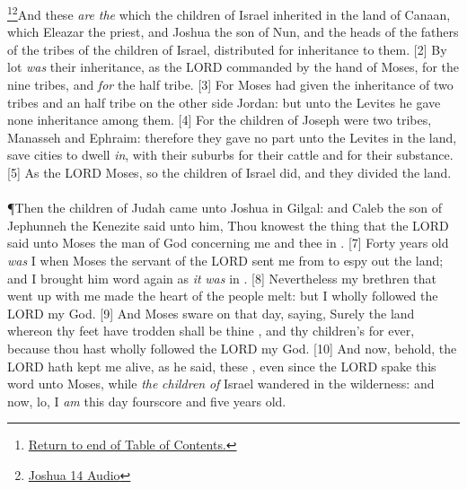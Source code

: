 \footnote{\textcolor[rgb]{0.00,0.25,0.00}{\hyperlink{TOC}{Return to end of Table of Contents.}}}\footnote{\href{https://audiobible.com/bible/joshua_14.html}{\textcolor[cmyk]{0.99998,1,0,0}{Joshua 14 Audio}}}\textcolor[cmyk]{0.99998,1,0,0}{And these \emph{are} \emph{the}  which the children of Israel inherited in the land of Canaan, which Eleazar the priest, and Joshua the son of Nun, and the heads of the fathers of the tribes of the children of Israel, distributed for inheritance to them.}
[2] \textcolor[cmyk]{0.99998,1,0,0}{By lot \emph{was} their inheritance, as the LORD commanded by the hand of Moses, for the nine tribes, and \emph{for} the half tribe.}
[3] \textcolor[cmyk]{0.99998,1,0,0}{For Moses had given the inheritance of two tribes and an half tribe on the other side Jordan: but unto the Levites he gave none inheritance among them.}
[4] \textcolor[cmyk]{0.99998,1,0,0}{For the children of Joseph were two tribes, Manasseh and Ephraim: therefore they gave no part unto the Levites in the land, save cities to dwell \emph{in}, with their suburbs for their cattle and for their substance.}
[5] \textcolor[cmyk]{0.99998,1,0,0}{As the LORD  Moses, so the children of Israel did, and they divided the land.}\\
\\
\P \textcolor[cmyk]{0.99998,1,0,0}{Then the children of Judah came unto Joshua in Gilgal: and Caleb the son of Jephunneh the Kenezite said unto him, Thou knowest the thing that the LORD said unto Moses the man of God concerning me and thee in .}
[7] \textcolor[cmyk]{0.99998,1,0,0}{Forty years old \emph{was} I when Moses the servant of the LORD sent me from  to espy out the land; and I brought him word again as \emph{it} \emph{was} in .}
[8] \textcolor[cmyk]{0.99998,1,0,0}{Nevertheless my brethren that went up with me made the heart of the people melt: but I wholly followed the LORD my God.}
[9] \textcolor[cmyk]{0.99998,1,0,0}{And Moses sware on that day, saying, Surely the land whereon thy feet have trodden shall be thine , and thy children's for ever, because thou hast wholly followed the LORD my God.}
[10] \textcolor[cmyk]{0.99998,1,0,0}{And now, behold, the LORD hath kept me alive, as he said, these , even since the LORD spake this word unto Moses, while \emph{the} \emph{children} \emph{of} Israel wandered in the wilderness: and now, lo, I \emph{am} this day fourscore and five years old.}
